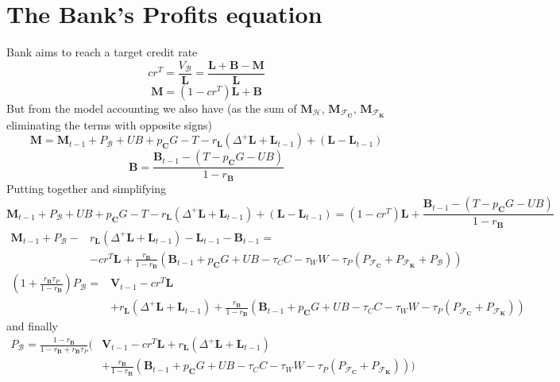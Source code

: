 \documentclass[]{article}
\begin{document}
\section{The Bank's Profits equation}
\label{app:eq}
Bank aims to reach a target credit rate
$${cr}^T = \frac{V_\mathcal{B}}{\mathbf{L}} = \frac{\mathbf{L} + \mathbf{B} - \mathbf{M}}{\mathbf{L}}$$
$$\mathbf{M} = (1-{cr}^T) \mathbf{L} + \mathbf{B}$$
But from the model accounting we also have (as the sum of $\mathbf{M}_\mathcal{H}$, $\mathbf{M}_{\mathcal{F}_\mathbf{C}}$, $\mathbf{M}_{\mathcal{F}_\mathbf{K}}$ eliminating the terms with opposite signs)
$$\mathbf{M} = \mathbf{M}_{t-1} + P_\mathcal{B} + UB + p_\mathbf{C} G - T -r_\mathbf{L}(\Delta^+\mathbf{L} + \mathbf{L}_{t-1}) + (\mathbf{L} - \mathbf{L}_{t-1})$$
$$\mathbf{B} = \frac{\mathbf{B}_{t-1} - (T - p_\mathbf{C}G - UB)}{1-r_\mathbf{B}}$$
Putting together and simplifying
$$\mathbf{M}_{t-1} + P_\mathcal{B} + UB + p_\mathbf{C} G - T -r_\mathbf{L}(\Delta^+\mathbf{L} + \mathbf{L}_{t-1}) + (\mathbf{L} - \mathbf{L}_{t-1}) = (1-{cr}^T) \mathbf{L} + \frac{\mathbf{B}_{t-1} - (T - p_\mathbf{C}G - UB)}{1-r_\mathbf{B}}$$
\begin{align*}
    \mathbf{M}_{t-1} + P_\mathcal{B} - & r_\mathbf{L} (\Delta^+\mathbf{L} + \mathbf{L}_{t-1}) - \mathbf{L}_{t-1} - \mathbf{B}_{t-1} =                                                                                                               \\
                                       & - {cr}^T \mathbf{L} + \frac{r_\mathbf{B}}{1-r_\mathbf{B}}(\mathbf{B}_{t-1} + p_\mathbf{C} G + UB - \tau_C C - \tau_W W - \tau_P (P_{\mathcal{F}_\mathbf{C}} + P_{\mathcal{F}_\mathbf{K}} + P_\mathcal{B}))
\end{align*}
\begin{align*}
    (1+\frac{r_\mathbf{B} \tau_P}{1-r_\mathbf{B}}) P_\mathcal{B}  = & \mathbf{V}_{t-1} - {cr}^T \mathbf{L}                                                                                                                                                                                          \\
                                                                    & + r_\mathbf{L} (\Delta^+\mathbf{L} + \mathbf{L}_{t-1}) + \frac{r_\mathbf{B}}{1-r_\mathbf{B}}(\mathbf{B}_{t-1} + p_\mathbf{C} G + UB - \tau_C C - \tau_W W - \tau_P (P_{\mathcal{F}_\mathbf{C}} + P_{\mathcal{F}_\mathbf{K}}))
\end{align*}
and finally
\begin{align*}
    P_\mathcal{B}  = \frac{1-r_\mathbf{B}}{1-r_\mathbf{B}+r_\mathbf{B}\tau_P}( & \mathbf{V}_{t-1} - {cr}^T \mathbf{L} + r_\mathbf{L} (\Delta^+\mathbf{L} + \mathbf{L}_{t-1})                                                                             \\
                                                                               & + \frac{r_\mathbf{B}}{1-r_\mathbf{B}}(\mathbf{B}_{t-1} + p_\mathbf{C} G + UB - \tau_C C - \tau_W W - \tau_P (P_{\mathcal{F}_\mathbf{C}} + P_{\mathcal{F}_\mathbf{K}})))
\end{align*}
\end{document}
